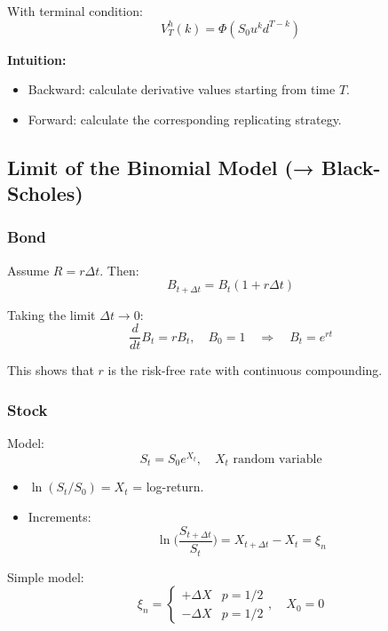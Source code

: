 \documentclass[12pt,a4paper]{article}
\theoremstyle{definition}
\begin{document}
With terminal condition:
\[
V_T^h(k) = \Phi(S_0 u^k d^{T-k})
\]

\begin{center}
\end{center}

\textbf{Intuition:}
\begin{itemize}
\item Backward: calculate derivative values starting from time $T$.
\item Forward: calculate the corresponding replicating strategy.
\end{itemize}

\subsection{Limit of the Binomial Model (→ Black-Scholes)}

\subsubsection{Bond}

Assume $R = r\Delta t$. Then:
\[
B_{t+\Delta t} = B_t(1+r\Delta t)
\]

Taking the limit $\Delta t \to 0$:
\[
\frac{d}{dt}B_t = rB_t, \quad B_0=1 \quad \Rightarrow \quad B_t = e^{rt}
\]

This shows that $r$ is the risk-free rate with continuous compounding.

\subsubsection{Stock}

Model:
\[
S_t = S_0 e^{X_t}, \quad X_t \text{ random variable}
\]

\begin{itemize}
\item $\ln(S_t/S_0) = X_t$ = log-return.
\item Increments:
\[
\ln\!\Big(\frac{S_{t+\Delta t}}{S_t}\Big) = X_{t+\Delta t} - X_t = \xi_n
\]
\end{itemize}

Simple model:
\[
\xi_n =
\begin{cases}
+\Delta X & p=1/2 \\
-\Delta X & p=1/2
\end{cases}, \quad X_0=0
\]
\end{document}
